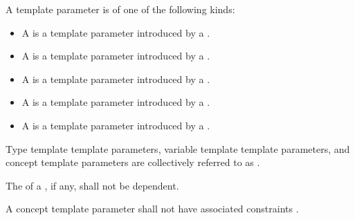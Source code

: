 \documentclass{wg21}
\begin{document}
\pnum
A template parameter is of one of the following kinds:
\begin{itemize}
    \item
    A  is
    a template parameter introduced by a .
    \item
    A  is
    a template parameter introduced by a .
    \item
    A  is
    a template parameter introduced by a .
    \item
    A  is
    a template parameter introduced by a .
    \item
    A  is
    a template parameter introduced by a .

\end{itemize}

\pnum
Type template template parameters,
variable template template parameters, and
concept template parameters
are collectively referred to as .

\pnum
The  of a ,
if any, shall not be dependent.

\pnum
A concept template parameter shall not have
associated constraints .
\end{document}
